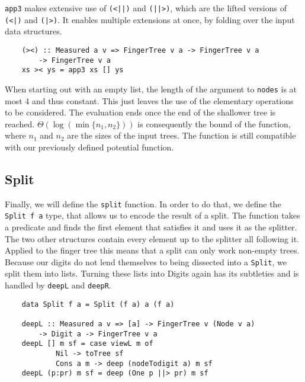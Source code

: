 \texttt{app3} makes extensive use of \texttt{(<||)} and \texttt{(||>)}, which are the lifted versions of \texttt{(<|)} and \texttt{(|>)}. It enables multiple extensions at once, by folding over the input data structures.

\begin{verbatim}
    (><) :: Measured a v => FingerTree v a -> FingerTree v a
        -> FingerTree v a
    xs >< ys = app3 xs [] ys
\end{verbatim}

When starting out with an empty list, the length of the argument to \texttt{nodes} is at most 4 and thus constant. This just leaves the use of the elementary operations to be considered. The evaluation ends once the end of the shallower tree is reached. \(\Theta(\log(\min\{n_1,n_2\}))\) is consequently the bound of the function, where \(n_1\) and \(n_2\) are the sizes of the input trees. The function is still compatible with our previously defined potential function.\par

\subsection{Split}

Finally, we will define the \texttt{split} function. In order to do that, we define the \texttt{Split f a} type, that allows us to encode the result of a split. The function takes a predicate and finds the first element that satisfies it and uses it as the splitter. The two other structures contain every element up to the splitter all following it. Applied to the finger tree this means that a split can only work non-empty trees. Because our digits do not lend themselves to being dissected into a \texttt{Split}, we split them into lists. Turning these lists into Digits again has its subtleties and is handled by \texttt{deepL} and \texttt{deepR}.

\begin{verbatim}
    data Split f a = Split (f a) a (f a)

    deepL :: Measured a v => [a] -> FingerTree v (Node v a)
        -> Digit a -> FingerTree v a
    deepL [] m sf = case viewL m of
            Nil -> toTree sf
            Cons a m -> deep (nodeTodigit a) m sf
    deepL (p:pr) m sf = deep (One p ||> pr) m sf
\end{verbatim}

